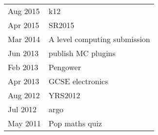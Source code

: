 
\begin{tabu} to \textwidth {X[1,l] X[8,l]}
    Aug 2015 & k12 \\
    Apr 2015 & SR2015 \\
    Mar 2014 & A level computing submission \\
    Jun 2013 & publish MC plugins \\
    Feb 2013 & Pengower \\
    Apr 2013 & GCSE electronics \\
    Aug 2012 & YRS2012 \\
    Jul 2012 & argo \\
    May 2011 & Pop maths quiz \\
\end{tabu}
